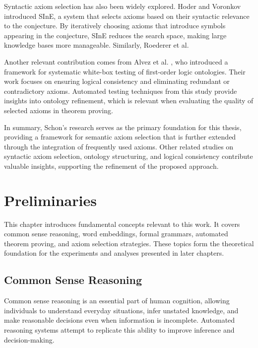 \documentclass[english,version-2020-11]{uzl-thesis}
\begin{document}
Syntactic axiom selection has also been widely explored. Hoder and Voronkov \cite{Hoder2011} introduced SInE, a system that selects axioms based on their syntactic relevance to the conjecture. By iteratively choosing axioms that introduce symbols appearing in the conjecture, SInE reduces the search space, making large knowledge bases more manageable. Similarly, Roederer et al.

Another relevant contribution comes from Alvez et al. \cite{Alvez2017}, who introduced a framework for systematic white-box testing of first-order logic ontologies. Their work focuses on ensuring logical consistency and eliminating redundant or contradictory axioms. Automated testing techniques from this study provide insights into ontology refinement, which is relevant when evaluating the quality of selected axioms in theorem proving.

In summary, Schon's research serves as the primary foundation for this thesis, providing a framework for semantic axiom selection that is further extended through the integration of frequently used axioms. Other related studies on syntactic axiom selection, ontology structuring, and logical consistency contribute valuable insights, supporting the refinement of the proposed approach.


\chapter{Preliminaries}
\label{chapter-preliminaries}

This chapter introduces fundamental concepts relevant to this work. It covers common sense reasoning, word embeddings, formal grammars, automated theorem proving, and axiom selection strategies. These topics form the theoretical foundation for the experiments and analyses presented in later chapters.

\section{Common Sense Reasoning}

Common sense reasoning is an essential part of human cognition, allowing individuals to understand everyday situations, infer unstated knowledge, and make reasonable decisions even when information is incomplete. Automated reasoning systems attempt to replicate this ability to improve inference and decision-making.
\end{document}
